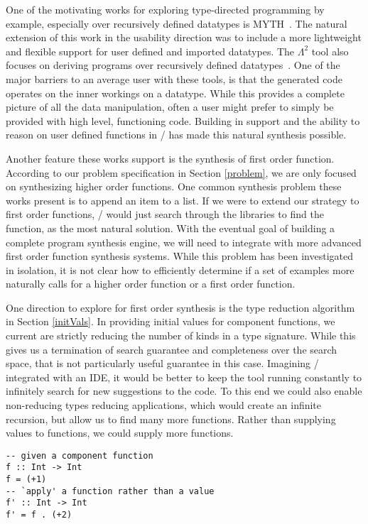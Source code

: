 One of the motivating works for exploring type-directed programming by example, especially over recursively defined datatypes is MYTH~\cite{Osera:2015, Osera:2016}. The natural extension of this work in the usability direction was to include a more lightweight and flexible support for user defined and imported datatypes. The $\Lambda^2$ tool also focuses on deriving programs over recursively defined datatypes~\cite{Feser:2015}. One of the major barriers to an average user with these tools, is that the generated code operates on the inner workings on a datatype. While this provides a complete picture of all the data manipulation, often a user might prefer to simply be provided with high level, functioning code. Building in support and the ability to reason on user defined functions in \ourTool/ has made this natural synthesis possible.

Another feature these works support is the synthesis of first order function.
According to our problem specification in Section \ref{problem}, we are only focused on synthesizing higher order functions.
One common synthesis problem these works present is to append an item to a list.
If we were to extend our strategy to first order functions, \ourTool/ would just search through the libraries to find the  function, as the most natural solution.
With the eventual goal of building a complete program synthesis engine, we will need to integrate with more advanced first order function synthesis systems.
While this problem has been investigated in isolation, it is not clear how to efficiently determine if a set of examples more naturally calls for a higher order function or a first order function.


One direction to explore for first order synthesis is the type reduction algorithm in Section \ref{initVals}.
In providing initial values for component functions, we current are strictly reducing the number of kinds in a type signature.
While this gives us a termination of search guarantee and completeness over the search space, that is not particularly useful guarantee in this case.
Imagining \ourTool/ integrated with an IDE, it would be better to keep the tool running constantly to infinitely search for new suggestions to the code.
To this end we could also enable non-reducing types reducing applications, which would create an infinite recursion, but allow us to find many more functions.
Rather than supplying values to functions, we could supply more functions.

\begin{lstlisting}[numbers=none]
-- given a component function
f :: Int -> Int
f = (+1)
-- `apply' a function rather than a value
f' :: Int -> Int
f' = f . (+2)

\end{lstlisting}

